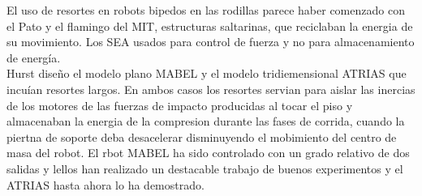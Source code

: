 \documentclass[10pt,onecolumn,twoside,letterpaper]{article}
\begin{document}
El uso de resortes en robots bipedos en las rodillas parece haber comenzado con el Pato y el flamingo del MIT, estructuras saltarinas, que reciclaban la energia de su movimiento. Los SEA usados para control de fuerza y no para almacenamiento de energ\'ia\cite{Grizzle2014}.\\
Hurst dise\~no el modelo plano MABEL y el modelo tridiemensional ATRIAS que incu\'ian resortes largos. En ambos casos los resortes servian para aislar las inercias de los motores de las fuerzas de impacto producidas al tocar el piso y almacenaban la energia de la compresion durante las fases de corrida, cuando la piertna de soporte deba desacelerar disminuyendo el mobimiento del centro de masa del robot. El rbot MABEL ha sido controlado con un grado relativo de dos salidas y lellos han realizado un destacable trabajo de buenos experimentos y el ATRIAS hasta ahora lo ha demostrado\cite{Grizzle2014}.\\
\href{run:/home/jackmaster/Downloads/[2014 Jessy W Grizzle and Christine  Chevallereau and Ryan  W Sinner and Aaron D Ames] Art Survey  paper: Models, feedback control and open problems of 3D bipedal robotic walking.pdf}{
}\cite{Grizzle2014}
\end{document}
